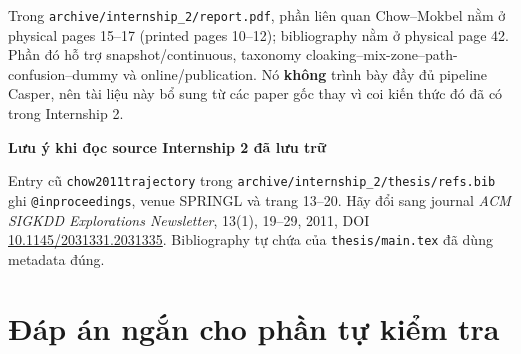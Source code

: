 \documentclass[11pt,a4paper,oneside]{report}
\newcommand{\code}[1]{\texttt{#1}}
\newenvironment{warningbox}[1][Cẩn thận]{%
  \par\medskip\noindent\begin{lrbox}{\warningstore}\begin{minipage}{.89\textwidth}
  {\sffamily\bfseries\color{red}#1}\par\smallskip}{%
  \end{minipage}\end{lrbox}\begin{center}\setlength{\fboxsep}{7pt}%
  \fcolorbox{red}{lightred}{\usebox{\warningstore}}\end{center}\medskip}
\begin{document}
Trong \code{archive/internship\_2/report.pdf}, phần liên quan Chow--Mokbel nằm ở physical
pages 15--17 (printed pages 10--12); bibliography nằm ở physical page 42. Phần đó
hỗ trợ snapshot/continuous, taxonomy cloaking--mix-zone--path-confusion--dummy và
online/publication. Nó \textbf{không} trình bày đầy đủ pipeline Casper, nên tài liệu
này bổ sung từ các paper gốc thay vì coi kiến thức đó đã có trong Internship 2.

\begin{warningbox}[Lưu ý khi đọc source Internship 2 đã lưu trữ]
Entry cũ \code{chow2011trajectory} trong
\code{archive/internship\_2/thesis/refs.bib} ghi
\code{@inproceedings}, venue SPRINGL và trang 13--20. Hãy đổi sang journal
\emph{ACM SIGKDD Explorations Newsletter}, 13(1), 19--29, 2011, DOI
\href{https://doi.org/10.1145/2031331.2031335}{10.1145/2031331.2031335}.
Bibliography tự chứa của \code{thesis/main.tex} đã dùng metadata đúng.
\end{warningbox}

\chapter{Đáp án ngắn cho phần tự kiểm tra}
\end{document}
